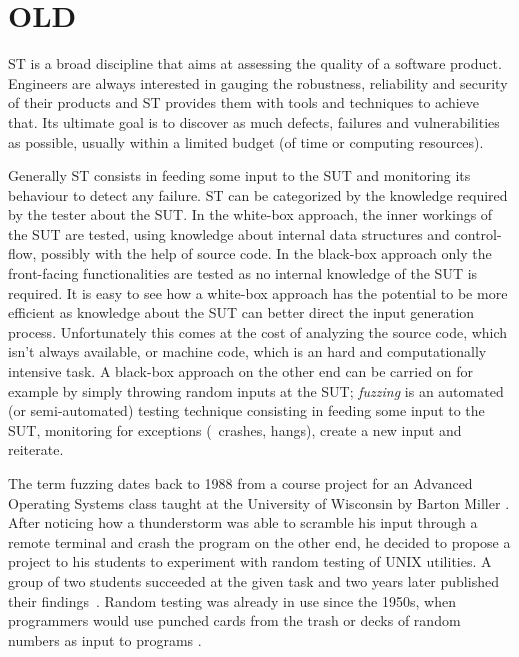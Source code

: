 




\section{OLD}

\ac{ST} is a broad discipline that aims at assessing the quality of a
software product. Engineers are always interested in gauging the robustness,
reliability and security of their products and \ac{ST} provides them with tools
and techniques to achieve that. Its ultimate goal is to discover as much defects,
failures and vulnerabilities as possible, usually within a limited budget (of
time or computing resources).

Generally \ac{ST} consists in feeding some input to the \ac{SUT} and monitoring
its behaviour to detect any failure. \ac{ST} can be categorized by the knowledge
required by the tester about the \ac{SUT}. In the white-box approach, the inner
workings of the \ac{SUT} are tested, using knowledge about internal data
structures and control-flow, possibly with the help of source code. In the
black-box approach only the front-facing functionalities are tested as no
internal knowledge of the \ac{SUT} is required. It is easy to see how a
white-box approach has the potential to be more efficient as knowledge about the
\ac{SUT} can better direct the input generation process. Unfortunately this
comes at the cost of analyzing the source code, which isn't always available, or
machine code, which is an hard and computationally intensive task. A black-box
approach on the other end can be carried on for example by simply throwing
random inputs at the \ac{SUT}; \emph{fuzzing} is an automated (or
semi-automated) testing technique consisting in feeding some input to the
\ac{SUT}, monitoring for exceptions (\ie~crashes, hangs), create a new input and
reiterate.

The term fuzzing dates back to 1988 from a course project for an Advanced
Operating Systems class taught at the University of Wisconsin by Barton Miller
\cite{takanen2008fuzzing}. After noticing how a thunderstorm was able to
scramble his input through a remote terminal and crash the program on the other
end, he decided to propose a project to his students to experiment with random
testing of UNIX utilities. A group of two students succeeded at the given task
and two years later published their findings~\cite{miller1990empirical}. Random
testing was already in use since the 1950s, when programmers would use punched
cards from the trash or decks of random numbers as input to programs
\cite{weinberg2008}.

